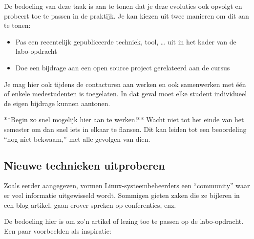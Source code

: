 De bedoeling van deze taak is aan te tonen dat je deze evoluties ook opvolgt en probeert toe te passen in de praktijk. Je kan kiezen uit twee manieren om dit aan te tonen:

\begin{itemize}
\item Pas een recentelijk gepubliceerde techniek, tool, \ldots{} uit in het kader van de labo-opdracht
\item Doe een bijdrage aan een open source project gerelateerd aan de cursus
\end{itemize}

Je mag hier ook tijdens de contacturen aan werken en ook samenwerken met één of enkele medestudenten is toegelaten. In dat geval moet elke student individueel de eigen bijdrage kunnen aantonen.

**Begin zo snel mogelijk hier aan te werken!** Wacht niet tot het einde van het semester om dan snel iets in elkaar te flansen. Dit kan leiden tot een beoordeling ``nog niet bekwaam,'' met alle gevolgen van dien.

\subsection{Nieuwe technieken uitproberen}
\label{subs:nieuwe-technieken-uitproberen}

Zoals eerder aangegeven, vormen Linux-systeembeheerders een ``community'' waar er veel informatie uitgewisseld wordt. Sommigen gieten zaken die ze bijleren in een blog-artikel, gaan erover spreken op conferenties, enz.

De bedoeling hier is om zo'n artikel of lezing toe te passen op de labo-opdracht. Een paar voorbeelden als inspiratie:


